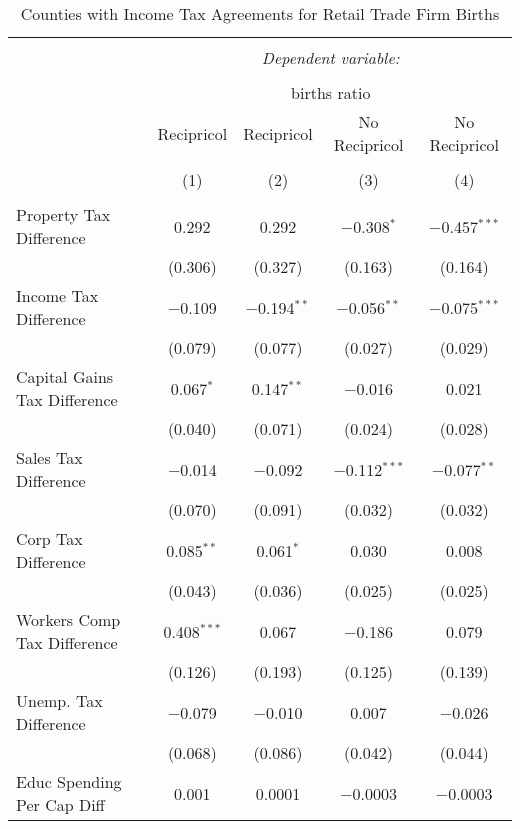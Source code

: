 
\begin{table}[!htbp] \centering 
  \caption{Counties with Income Tax Agreements for  Retail Trade Firm Births} 
  \label{44-45agreement} 
\begin{tabular}{@{\extracolsep{5pt}}lcccc} 
\\[-1.8ex]\hline 
\hline \\[-1.8ex] 
 & \multicolumn{4}{c}{\textit{Dependent variable:}} \\ 
\cline{2-5} 
\\[-1.8ex] & \multicolumn{4}{c}{births ratio} \\ 
 & Recipricol & Recipricol & No Recipricol & No Recipricol \\ 
\\[-1.8ex] & (1) & (2) & (3) & (4)\\ 
\hline \\[-1.8ex] 
 Property Tax Difference & 0.292 & 0.292 & $-$0.308$^{*}$ & $-$0.457$^{***}$ \\ 
  & (0.306) & (0.327) & (0.163) & (0.164) \\ 
  Income Tax Difference & $-$0.109 & $-$0.194$^{**}$ & $-$0.056$^{**}$ & $-$0.075$^{***}$ \\ 
  & (0.079) & (0.077) & (0.027) & (0.029) \\ 
  Capital Gains Tax Difference & 0.067$^{*}$ & 0.147$^{**}$ & $-$0.016 & 0.021 \\ 
  & (0.040) & (0.071) & (0.024) & (0.028) \\ 
  Sales Tax Difference & $-$0.014 & $-$0.092 & $-$0.112$^{***}$ & $-$0.077$^{**}$ \\ 
  & (0.070) & (0.091) & (0.032) & (0.032) \\ 
  Corp Tax Difference & 0.085$^{**}$ & 0.061$^{*}$ & 0.030 & 0.008 \\ 
  & (0.043) & (0.036) & (0.025) & (0.025) \\ 
  Workers Comp Tax Difference & 0.408$^{***}$ & 0.067 & $-$0.186 & 0.079 \\ 
  & (0.126) & (0.193) & (0.125) & (0.139) \\ 
  Unemp. Tax Difference & $-$0.079 & $-$0.010 & 0.007 & $-$0.026 \\ 
  & (0.068) & (0.086) & (0.042) & (0.044) \\ 
  Educ Spending Per Cap Diff & 0.001 & 0.0001 & $-$0.0003 & $-$0.0003 \\ 

\end{tabular}
\end{table}
